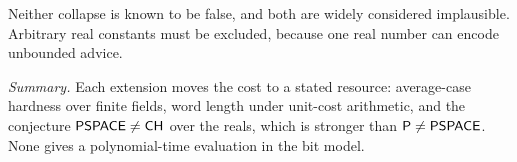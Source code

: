 Neither collapse is known to be false, and both are widely considered implausible. Arbitrary real constants must be excluded, because one real number can encode unbounded advice.

\noindent\emph{Summary.} Each extension moves the cost to a stated resource: average-case hardness over finite fields, word length under unit-cost arithmetic, and the conjecture $\mathsf{PSPACE}\neq\mathsf{CH}$ over the reals, which is stronger than $\mathsf{P}\neq\mathsf{PSPACE}$. None gives a polynomial-time evaluation in the bit model.
